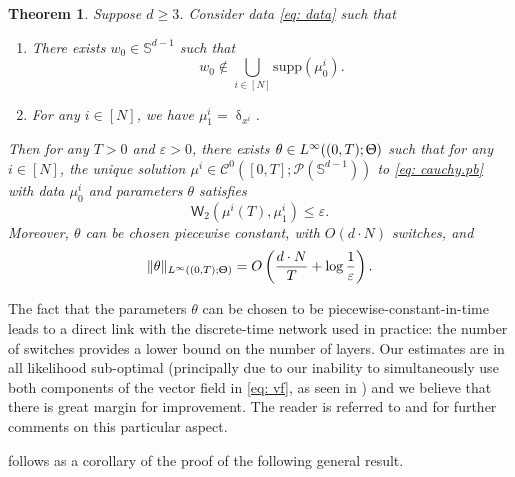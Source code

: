 \documentclass[a4paper,11pt]{article}
\theoremstyle{plain}
\newtheorem{theorem}{Theorem}[section]
\newcommand{\supp}{\mathrm{supp}}
\renewcommand{\S}{\mathbb{S}^{d-1}}
\renewcommand{\leq}{\leqslant}
\renewcommand{\geq}{\geqslant}
\numberwithin{equation}{section}
\newcommand{\nbbg}[1]{ {\text{\bf bg:} \color{mygrey}{#1}} }
\newcommand{\ndpr}[1]{ {\colorbox{MIT}{\color{white} \textsf{PR}} \color{MIT}{#1}} }
\begin{document}
\begin{theorem} \label{thm: targets.atoms}
    Suppose $d\geq3$.
    Consider data %
    \eqref{eq: data} such that 
    \begin{enumerate}
    \item There exists $w_0\in\S$ such that
    \begin{equation} \label{eq: first.assp}
        w_0\notin\bigcup_{i\in[N]} \supp(\mu_0^i). 
    \end{equation} 
    \item For any $i\in[N]$, we have $\mu^i_1=\updelta_{x^i}$.
    \end{enumerate}
    Then for any $T>0$ and $\varepsilon>0$, there exists $\theta\in L^\infty((0,T);\Uptheta)$ such that for any $i\in[N]$, the unique solution $\mu^i\in\mathscr{C}^0([0,T];\mathscr{P}(\S))$ to \eqref{eq: cauchy.pb} with data $\mu_0^i$ and parameters $\theta$ satisfies
    \begin{equation*}
        \mathsf{W}_2\left(\mu^i(T),\mu_1^i\right)\leq\varepsilon.
    \end{equation*}
    Moreover, $\theta$ can be chosen piecewise constant, with  $O(d\cdot N)$ switches, and $$\|\theta\|_{L^\infty((0,T);\Uptheta)}=O\left(\frac{d\cdot N}{T}+\log\frac{1}{\varepsilon}\right).$$
\end{theorem}


The fact that the parameters $\theta$ can be chosen to be piecewise-constant-in-time leads to a direct link with the discrete-time network used in practice: the number of switches provides a lower bound on the number of layers. Our estimates are in all likelihood sub-optimal (principally due to our inability to simultaneously use both components of the vector field in \eqref{eq: vf}, as seen in {\bf {}}) and we believe that there is great margin for improvement. The reader is referred to {\bf {}} and {\bf {}} for further comments on this particular aspect.


 follows as a corollary of the proof of the following general result.
\end{document}
